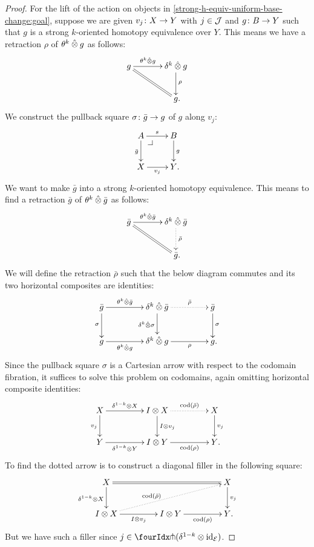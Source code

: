 \documentclass[reqno,10pt,a4paper,oneside,draft]{amsart}
\begin{document}
\begin{proof}
For the lift of the action on objects in \eqref{strong-h-equiv-uniform-base-change:goal}, suppose we are given $v_j \co X \to Y$ with $j \in \cal{J}$ and $g \co B \to Y$ such that $g$ is a strong $k$-oriented homotopy equivalence over $Y$.
This means we have a retraction $\rho$ of $\thetak \hatotimes g$ as follows:
\begin{align*}
\xymatrix@C+1em{
  g
  \ar[r]^-{\thetak \hatotimes g}
  \ar@{=}[dr]
&
  \kcyl \hatotimes g \ar[d]^{\rho}
\\&
  g
\rlap{.}}
\end{align*}
We construct the pullback square $\sigma \co \bar{g} \to g$ of $g$ along $v_j$:
\begin{equation} \label{strong-h-equiv-uniform-base-change:0}
\begin{gathered}
\xymatrix{
  A
  \ar[r]^-{s}
  \ar[d]_{\bar{g}}
  \pullback{dr}
&
  B
  \ar[d]^{g}
\\
  X
  \ar[r]_{v_j}
&
  Y
\rlap{.}}
\end{gathered}
\end{equation}
We want to make $\bar{g}$ into a strong $k$-oriented homotopy equivalence.
This means to find a retraction $\bar{g}$ of $\thetak \hatotimes \bar{g}$ as follows:
\[
\xymatrix@C+1em{
  \bar{g}
  \ar[r]^-{\thetak \hatotimes \bar{g}}
  \ar@{=}[dr]
&
  \kcyl \hatotimes \bar{g}
  \ar@{.>}[d]^{\bar{\rho}}
\\&
  \bar{g}
\rlap{.}}
\]
We will define the retraction $\bar{\rho}$ such that the below diagram commutes and its two horizontal composites are identities:
\[
\xymatrix@C+2em{
  \bar{g}
  \ar[r]^-{\thetak \hatotimes \bar{g}}
  \ar[d]_{\sigma}
&
  \kcyl \hatotimes \bar{g}
  \ar@{.>}[r]^-{\bar{\rho}}
  \ar[d]_{\kcyl \hatotimes \sigma}
&
  \bar{g}
  \ar[d]^{\sigma}
\\
  g
  \ar[r]_-{\thetak \hatotimes g}
&
  \kcyl \hatotimes g
  \ar[r]_-{\rho}
&
  g
\rlap{.}}
\]
Since the pullback square $\sigma$ is a Cartesian arrow with respect to the codomain fibration, it suffices to solve this problem on codomains, again omitting horizontal composite identities:
\[
\xymatrix@C+2em{
  X
  \ar[r]^-{\kcylinv \otimes X}
  \ar[d]_{v_j}
&
  \interval \otimes X
  \ar@{.>}[r]^-{\cod(\bar{\rho})}
  \ar[d]^{\interval \otimes v_j}
&
  X
  \ar[d]^{v_j}
\\
  Y
  \ar[r]_-{\kcylinv \otimes Y}
&
  \interval \otimes Y
  \ar[r]_-{\cod(\rho)}
&
  Y
\rlap{.}}
\]
To find the dotted arrow is to construct a diagonal filler in the following square:
\[
\xymatrix@C+2em{
  X
  \ar@{=}[rr]
  \ar[d]_{\kcylinv \otimes X}
&&
  X
  \ar[d]^{v_j}
\\
  \interval \otimes X
  \ar[r]_-{I \otimes v_j}
  \ar@{.>}[urr]^(0.4){\cod(\bar{\rho})}
&
  \interval \otimes Y
  \ar[r]_-{\cod(\rho)}
&
  Y
\rlap{.}}
\]
But we have such a filler since $j \in \liftr{(\kcylinv \otimes \id_\catE)}$.


\end{proof}
\end{document}
